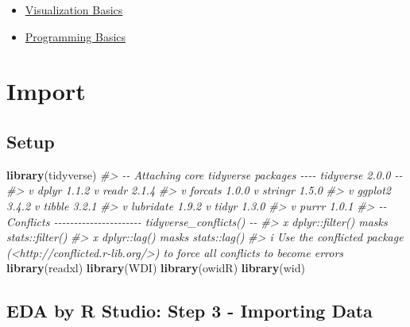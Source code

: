 \documentclass[
  xelatex, ja=standard]{bxjsbook}
\newenvironment{Shaded}{\begin{snugshade}}{\end{snugshade}}
\newcommand{\CommentTok}[1]{\textcolor[rgb]{0.56,0.35,0.01}{\textit{#1}}}
\newcommand{\FunctionTok}[1]{\textcolor[rgb]{0.13,0.29,0.53}{\textbf{#1}}}
\newcommand{\NormalTok}[1]{#1}
\providecommand{\tightlist}{%
  \setlength{\itemsep}{0pt}\setlength{\parskip}{0pt}}
\theoremstyle{definition}
\theoremstyle{definition}
\theoremstyle{definition}
\theoremstyle{definition}
\theoremstyle{remark}
\begin{document}
\begin{itemize}
\tightlist
\item
  \href{https://rstudio.cloud/learn/primers/1.1}{Visualization Basics}
\item
  \href{https://rstudio.cloud/learn/primers/1.2}{Programming Basics}
\end{itemize}

\hypertarget{import}{%
\chapter{Import}\label{import}}

\hypertarget{setup}{%
\section{Setup}\label{setup}}

\begin{Shaded}
\begin{Highlighting}[]
\FunctionTok{library}\NormalTok{(tidyverse)}
\CommentTok{\#\textgreater{} {-}{-} Attaching core tidyverse packages {-}{-}{-}{-} tidyverse 2.0.0 {-}{-}}
\CommentTok{\#\textgreater{} v dplyr     1.1.2     v readr     2.1.4}
\CommentTok{\#\textgreater{} v forcats   1.0.0     v stringr   1.5.0}
\CommentTok{\#\textgreater{} v ggplot2   3.4.2     v tibble    3.2.1}
\CommentTok{\#\textgreater{} v lubridate 1.9.2     v tidyr     1.3.0}
\CommentTok{\#\textgreater{} v purrr     1.0.1     }
\CommentTok{\#\textgreater{} {-}{-} Conflicts {-}{-}{-}{-}{-}{-}{-}{-}{-}{-}{-}{-}{-}{-}{-}{-}{-}{-}{-}{-}{-}{-} tidyverse\_conflicts() {-}{-}}
\CommentTok{\#\textgreater{} x dplyr::filter() masks stats::filter()}
\CommentTok{\#\textgreater{} x dplyr::lag()    masks stats::lag()}
\CommentTok{\#\textgreater{} i Use the conflicted package (\textless{}http://conflicted.r{-}lib.org/\textgreater{}) to force all conflicts to become errors}
\FunctionTok{library}\NormalTok{(readxl)}
\FunctionTok{library}\NormalTok{(WDI)}
\FunctionTok{library}\NormalTok{(owidR)}
\FunctionTok{library}\NormalTok{(wid)}
\end{Highlighting}
\end{Shaded}

\hypertarget{eda-by-r-studio-step-3---importing-data}{%
\section{EDA by R Studio: Step 3 - Importing Data}\label{eda-by-r-studio-step-3---importing-data}}
\end{document}
